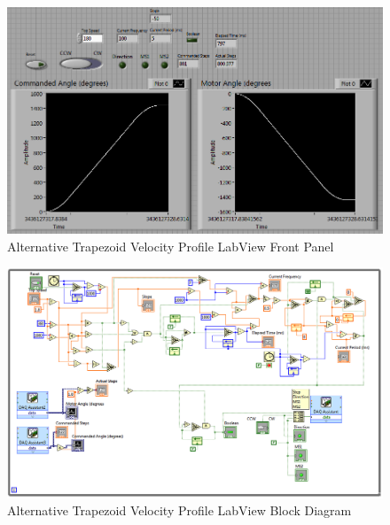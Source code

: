 \documentclass{article}
\theoremstyle{plain}
\theoremstyle{definition}
\theoremstyle{remark}
\begin{document}
\begin{figure}
\begin{center}
\includegraphics[width = 13cm]{trapezoidLabViewFront.png}
\caption{Alternative Trapezoid Velocity Profile LabView Front Panel}
\label{Q4a_Alt1}
\end{center}
\end{figure}

\begin{figure}
\begin{center}
\includegraphics[width = 16cm]{trapezoidLabViewBlock.png}
\caption{Alternative Trapezoid Velocity Profile LabView Block Diagram}
\label{Q4a_Alt2}
\end{center}
\end{figure}
\end{document}
